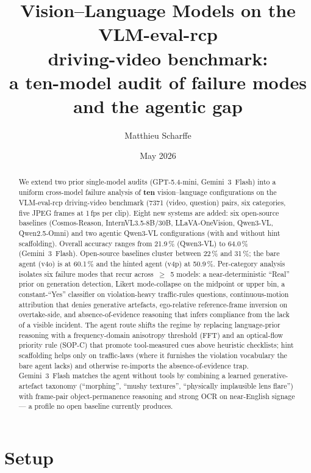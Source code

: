 \documentclass[11pt,a4paper]{article}
\title{Vision--Language Models on the VLM-eval-rcp\\driving-video benchmark:\\
a ten-model audit of failure modes\\and the agentic gap}
\author{Matthieu Scharffe}
\date{May 2026}
\providecommand{\num}[1]{#1}
\newcommand{\pct}[1]{#1\,\%}
\begin{document}
\maketitle

\begin{abstract}
We extend two prior single-model audits (GPT-5.4-mini, Gemini~3~Flash) into
a uniform cross-model failure analysis of \textbf{ten} vision--language
configurations on the VLM-eval-rcp driving-video benchmark
(\num{7371} (video, question) pairs, six categories, five JPEG frames at
1\,fps per clip). Eight new systems are added: six open-source baselines
(Cosmos-Reason, InternVL3.5-8B/30B, LLaVA-OneVision, Qwen3-VL,
Qwen2.5-Omni) and two agentic Qwen3-VL configurations (with and without
hint scaffolding). Overall accuracy ranges from \pct{21.9} (Qwen3-VL) to
\pct{64.0} (Gemini~3~Flash). Open-source baselines cluster between
\pct{22} and \pct{31}; the bare agent (v4o) is at \pct{60.1} and the
hinted agent (v4p) at \pct{50.9}. Per-category analysis isolates six
failure modes that recur across~$\geq$~5 models: a near-deterministic
``Real'' prior on generation detection, Likert mode-collapse on the
midpoint or upper bin, a constant-``Yes'' classifier on
violation-heavy traffic-rules questions, continuous-motion attribution
that denies generative artefacts, ego-relative reference-frame
inversion on overtake-side, and absence-of-evidence reasoning that
infers compliance from the lack of a visible incident. The agent route
shifts the regime by replacing language-prior reasoning with a
frequency-domain anisotropy threshold (FFT) and an optical-flow priority
rule (SOP-C) that promote tool-measured cues above heuristic checklists;
hint scaffolding helps only on traffic-laws (where it furnishes the
violation vocabulary the bare agent lacks) and otherwise re-imports the
absence-of-evidence trap. Gemini~3~Flash matches the agent without
tools by combining a learned generative-artefact taxonomy
(``morphing'', ``mushy textures'', ``physically implausible lens
flare'') with frame-pair object-permanence reasoning and strong OCR on
near-English signage --- a profile no open baseline currently produces.
\end{abstract}

\section{Setup}
\label{sec:setup}
\end{document}
